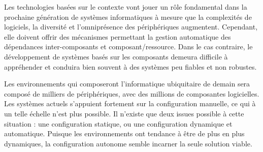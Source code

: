 Les technologies basées sur le contexte vont jouer un rôle fondamental dans la
prochaine génération de systèmes informatiques à mesure que la complexités de
logiciels, la diversité et l'omniprésence des périphériques augmentent.
Cependant, elle doivent offrir des mécanismes permettant la gestion automatique
des dépendances inter-composants et composant/ressource. Dans le cas contraire,
le développement de systèmes basés sur les composants demeura difficile à
appréhender et conduira bien souvent à des systèmes peu fiables et non robustes.

Les environnements qui composeront l'informatique ubiquitaire de demain sera
composé de milliers de périphériques, avec des millions de composantes
logicielles. Les systèmes actuels s'appuient fortement sur la configuration
manuelle, ce qui à un telle échelle n'est plus possible. Il n'existe que deux
issues possible à cette situation : une configuration statique, ou une
configuration dynamique et automatique. Puisque les environnements ont
tendance à être de plus en plus dynamiques, la configuration autonome semble
incarner la seule solution viable.

